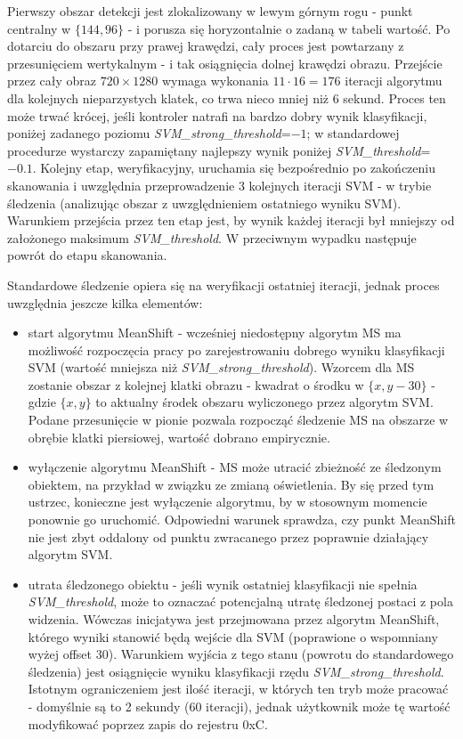 Pierwszy obszar detekcji jest zlokalizowany w lewym górnym rogu - punkt centralny w $\{144,96\}$ - i porusza się horyzontalnie o zadaną w tabeli wartość. Po dotarciu do obszaru przy prawej krawędzi, cały proces jest powtarzany z przesunięciem wertykalnym - i tak osiągnięcia dolnej krawędzi obrazu. Przejście przez cały obraz $720\times 1280$ wymaga wykonania $11\cdot16=176$ iteracji algorytmu dla kolejnych nieparzystych klatek, co trwa nieco mniej niż 6 sekund. Proces ten może trwać krócej, jeśli kontroler natrafi na bardzo dobry wynik klasyfikacji, poniżej zadanego poziomu \textit{SVM\_strong\_threshold}=$-1$; w standardowej procedurze wystarczy zapamiętany najlepszy wynik poniżej \textit{SVM\_threshold}=$-0.1$.  Kolejny etap, weryfikacyjny, uruchamia się bezpośrednio po zakończeniu skanowania i uwzględnia przeprowadzenie 3 kolejnych iteracji SVM - w trybie śledzenia (analizując obszar z uwzględnieniem ostatniego wyniku SVM). Warunkiem przejścia przez ten etap jest, by wynik każdej iteracji był mniejszy od założonego maksimum \textit{SVM\_threshold}. W przeciwnym wypadku następuje powrót do etapu skanowania. 

Standardowe śledzenie opiera się na weryfikacji ostatniej iteracji, jednak proces uwzględnia jeszcze kilka elementów:
\begin{itemize}
	\item start algorytmu MeanShift - wcześniej niedostępny algorytm MS ma możliwość rozpoczęcia pracy po zarejestrowaniu dobrego wyniku klasyfikacji SVM (wartość mniejsza niż \textit{SVM\_strong\_threshold}). Wzorcem dla MS zostanie obszar z kolejnej klatki obrazu - kwadrat o środku w $\{x,y-30\}$ - gdzie $\{x,y\}$ to aktualny środek obszaru wyliczonego przez algorytm SVM. Podane przesunięcie w pionie pozwala rozpocząć śledzenie MS na obszarze w obrębie klatki piersiowej, wartość dobrano empirycznie.
	\item wyłączenie algorytmu MeanShift - MS może utracić zbieżność ze śledzonym obiektem, na przykład w związku ze zmianą oświetlenia. By się przed tym ustrzec, konieczne jest wyłączenie algorytmu, by w stosownym momencie ponownie go uruchomić. Odpowiedni warunek sprawdza, czy punkt MeanShift nie jest zbyt oddalony od punktu zwracanego przez poprawnie działający algorytm SVM.
	\item utrata śledzonego obiektu - jeśli wynik ostatniej klasyfikacji nie spełnia \textit{SVM\_threshold}, może to oznaczać potencjalną utratę śledzonej postaci z pola widzenia. Wówczas inicjatywa jest przejmowana przez algorytm MeanShift, którego wyniki stanowić będą wejście dla SVM (poprawione o wspomniany wyżej offset $30$). Warunkiem wyjścia z tego stanu (powrotu do standardowego śledzenia) jest osiągnięcie wyniku klasyfikacji rzędu \textit{SVM\_strong\_threshold}. Istotnym ograniczeniem jest ilość iteracji, w których ten tryb może pracować - domyślnie są to 2 sekundy (60 iteracji), jednak użytkownik może tę wartość modyfikować poprzez zapis do rejestru 0xC.
\end{itemize} 

